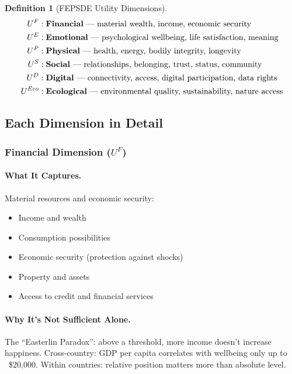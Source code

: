 \documentclass[12pt,a4paper]{article}
\newtheorem{definition}[theorem]{Definition}
\begin{document}
\begin{definition}[FEPSDE Utility Dimensions]
\label{def:fepsde}
\begin{align*}
  U^F &: \text{\textbf{Financial} --- material wealth, income, economic security} \\
  U^E &: \text{\textbf{Emotional} --- psychological wellbeing, life satisfaction, meaning} \\
  U^P &: \text{\textbf{Physical} --- health, energy, bodily integrity, longevity} \\
  U^S &: \text{\textbf{Social} --- relationships, belonging, trust, status, community} \\
  U^D &: \text{\textbf{Digital} --- connectivity, access, digital participation, data rights} \\
  U^{Eco} &: \text{\textbf{Ecological} --- environmental quality, sustainability, nature access}
\end{align*}
\end{definition}

\subsection{Each Dimension in Detail}

\subsubsection{Financial Dimension ($U^F$)}

\paragraph{What It Captures.}
Material resources and economic security:
\begin{itemize}
  \item Income and wealth
  \item Consumption possibilities
  \item Economic security (protection against shocks)
  \item Property and assets
  \item Access to credit and financial services
\end{itemize}

\paragraph{Why It's Not Sufficient Alone.}
The ``Easterlin Paradox'': above a threshold, more income doesn't increase happiness.
Cross-country: GDP per capita correlates with wellbeing only up to ~\$20,000.
Within countries: relative position matters more than absolute level.
\end{document}

